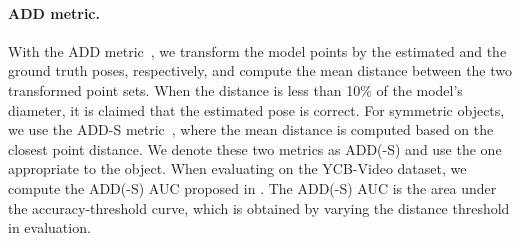 \documentclass[10pt,twocolumn,letterpaper]{article}
\begin{document}
\paragraph{ADD metric.} With the ADD metric~\cite{hinterstoisser2012model}, we transform the model points by the estimated and the ground truth poses, respectively, and compute the mean distance between the two transformed point sets. When the distance is less than 10\% of the model's diameter, it is claimed that the estimated pose is correct. For symmetric objects, we use the ADD-S metric~\cite{xiang2017posecnn}, where the mean distance is computed based on the closest point distance. We denote these two metrics as ADD(-S) and use the one appropriate to the object. When evaluating on the YCB-Video dataset, we compute the ADD(-S) AUC proposed in \cite{xiang2017posecnn}. The ADD(-S) AUC is the area under the accuracy-threshold curve, which is obtained by varying the distance threshold in evaluation.
\end{document}
